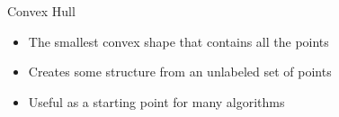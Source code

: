 \begin{frame}{Convex Hull}
	\begin{itemize}
		\item The smallest convex shape that contains all the points
		\item Creates some structure from an unlabeled set of points
		\item Useful as a starting point for many algorithms
	\end{itemize}
	
\end{frame}
